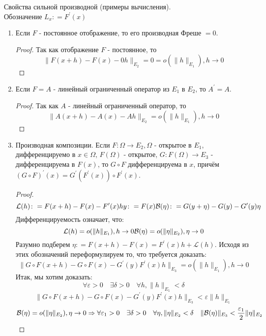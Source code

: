 \begin{theorem}Свойства сильной производной (примеры вычисления).\\
Обозначение $L_x \colon = F^\prime (x)$
\begin{enumerate}
    \item Если $F$ - постоянное отображение, то его производная Фреше $=0$.
    \begin{proof}
        Так как отображение $F$ - постоянное, то
        \[
            \|F(x+h)-F(x)-0h\|_{E_2} = 0 = o(\|h\|_{E_1}), h \to 0
        \]
    \end{proof}
    \item Если $F=A$ - линейный ограниченный оператор из $E_1$ в $E_2$, то $A^\prime=A$.
    \begin{proof}
        Так как $A$ - линейный ограниченный оператор, то
        \[
            \|A(x+h)-A(x)-A h\|_{E_2} = o(\|h\|_{E_1}), h \to 0
        \]
    \end{proof}
    \item Производная композиции. Если $F\colon \Omega \to E_2, \Omega$ - открытое в $E_1$, дифференцируемо в $x \in \Omega$, $F(\Omega)$ - открытое, $G \colon F(\Omega) \to E_3$ - дифференцируема в $F(x)$, то $G \circ F$ дифференцируема в $x$, причём $(G \circ F)^\prime (x) = G^\prime(F^\prime (x)) \circ F^\prime (x)$.
    \begin{proof}
        \[
            \mathcal{L} (h) \colon=F(x+h)-F(x)-F^\prime (x)h \\
            y\colon=F(x)\\
            \mathcal{B}(\eta) \colon=G(y+\eta)-G(y)-G^\prime(y)\eta
        \]
        Дифференцируемость означает, что$\colon$
        \[
            \mathcal{L} (h) = o(\|h\|_{E_1}), h \to 0\\
            \mathcal{B}(\eta)= o(\|\eta\|_{E_2}), \eta \to 0
        \]
        Разумно подберем $\eta \colon= F(x+h)-F(x)=F^\prime (x) h + \mathcal{L}(h) $. Исходя из этих обозначений переформулируем то, что требуется доказать:
        \[
            \|G \circ F (x+h) - G\circ F (x)-G^\prime (y) F^\prime (x) h \|_{E_3}=o(\|h\|_{E_1}), h \to 0 
        \]
        Итак, мы хотим доказать$\colon$
        \[
            \forall \varepsilon>0 \quad \exists \delta>0 \quad \forall h, \|h\|_{E_1}<\delta
        \]
        \[
            \|G \circ F (x+h) - G\circ F (x)-G^\prime (y) F^\prime (x) h \|_{E_3} < \varepsilon \|h\|_{E_1}
        \] 
        \[
            \mathcal{B}(\eta)= o(\|\eta\|_{E_2}), \eta \to 0 \Rightarrow \forall \varepsilon_1>0\quad \exists \delta>0 \quad \forall \eta, \|\eta\|_{E_2}<\delta \quad \|\mathcal{B}(\eta)\|_{E_3}<\frac{\varepsilon_1}{2}\|\eta\|_{E_2}
\]
\end{proof}
\end{enumerate}
\end{theorem}
